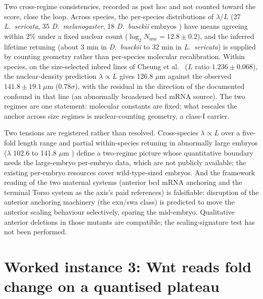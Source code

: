 \documentclass[11pt,a4paper]{article}
\begin{document}
Two cross-regime consistencies, recorded as post hoc and not counted toward the score, close the loop. Across species, the per-species distributions of $\lambda/L$ (27 \emph{L.\ sericata}, 35 \emph{D.\ melanogaster}, 18 \emph{D.\ busckii} embryos \cite{Gregor2005}) have means agreeing within 2\% under a fixed nuclear count ($\log_2 N_{\mathrm{nuc}}=12.8\pm0.2$), and the inferred lifetime retuning (about 3 min in \emph{D.\ busckii} to 32 min in \emph{L.\ sericata}) is supplied by counting geometry rather than per-species molecular recalibration. Within species, on the size-selected inbred lines of Cheung et al.\ \cite{Cheung2014} ($L$ ratio $1.236\pm0.068$), the nuclear-density prediction $\lambda\propto L$ gives 126.8 $\mu$m against the observed $141.8\pm19.1\ \mu$m ($0.78\sigma$), with the residual in the direction of the documented confound in that line (an abnormally broadened bcd mRNA source). The two regimes are one statement: molecular constants are fixed; what rescales the anchor across size regimes is nuclear-counting geometry, a class-I carrier.

Two tensions are registered rather than resolved. Cross-species $\lambda\propto L$ over a five-fold length range \cite{Gregor2005} and partial within-species retuning in abnormally large embryos ($\lambda$ 102.6 to 141.8 $\mu$m \cite{Liu2013,Cheung2014}) define a two-regime picture whose quantitative boundary needs the large-embryo per-embryo data, which are not publicly available; the existing per-embryo resources \cite{Gregor2007,Petkova2019} cover wild-type-sized embryos. And the framework reading of the two maternal systems (anterior bcd mRNA anchoring and the terminal Torso system as the axis's paid references) is falsifiable: disruption of the anterior anchoring machinery (the exu/swa class) is predicted to move the anterior scaling behaviour selectively, sparing the mid-embryo. Qualitative anterior deletions in those mutants are compatible; the scaling-signature test has not been performed.

\section{Worked instance 3: Wnt reads fold change on a quantised plateau}
\label{sec:wnt}
\end{document}
